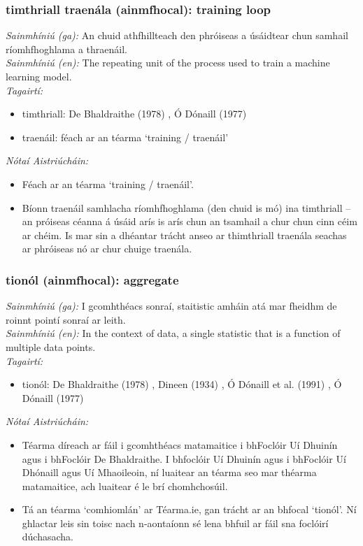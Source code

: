 \documentclass{article}
\begin{document}
\subsubsection*{timthriall traenála (ainmfhocal): training loop}
 \noindent \textit{Sainmhíniú (ga):} An chuid athfhillteach den phróiseas a úsáidtear chun samhail ríomhfhoghlama a thraenáil.
\\
 \noindent \textit{Sainmhíniú (en):} The repeating unit of the process used to train a machine learning model.
\\
 \noindent \textit{Tagairtí:}
\begin{itemize}
	\item timthriall: De Bhaldraithe (1978) \cite{de-bhaldraithe}, Ó Dónaill (1977) \cite{odonaill}
	\item traenáil: féach ar an téarma `training / traenáil'
\end{itemize}

 \noindent \textit{Nótaí Aistriúcháin:}
\begin{itemize}
	\item Féach ar an téarma `training / traenáil'.
	\item Bíonn traenáil samhlacha ríomhfhoghlama (den chuid is mó) ina timthriall -- an próiseas céanna á úsáid arís is arís chun an tsamhail a chur chun cinn céim ar chéim. Is mar sin a dhéantar trácht anseo ar thimthriall traenála seachas ar phróiseas nó ar chur chuige traenála.
\end{itemize}


\subsubsection*{tionól (ainmfhocal): aggregate}
 \noindent \textit{Sainmhíniú (ga):} I gcomhthéacs sonraí, staitistic amháin atá mar fheidhm de roinnt pointí sonraí ar leith.
\\
 \noindent \textit{Sainmhíniú (en):} In the context of data, a single statistic that is a function of multiple data points.
\\
 \noindent \textit{Tagairtí:}
\begin{itemize}
	\item tionól: De Bhaldraithe (1978) \cite{de-bhaldraithe}, Dineen (1934) \cite{dineen}, Ó Dónaill et al. (1991) \cite{focloir-beag}, Ó Dónaill (1977) \cite{odonaill}
\end{itemize}

 \noindent \textit{Nótaí Aistriúcháin:}
\begin{itemize}
	\item Téarma díreach ar fáil i gcomhthéacs matamaitice i bhFoclóir Uí Dhuinín agus i bhFoclóir De Bhaldraithe. I bhfoclóir Uí Dhuinín agus i bhFoclóir Uí Dhónaill agus Uí Mhaoileoin, ní luaitear an téarma seo mar théarma matamaitice, ach luaitear é le brí chomhchosúil.
	\item Tá an téarma `comhiomlán' ar Téarma.ie, gan trácht ar an bhfocal `tionól'. Ní ghlactar leis sin toisc nach n-aontaíonn sé lena bhfuil ar fáil sna foclóirí dúchasacha. 
\end{itemize}
\end{document}

